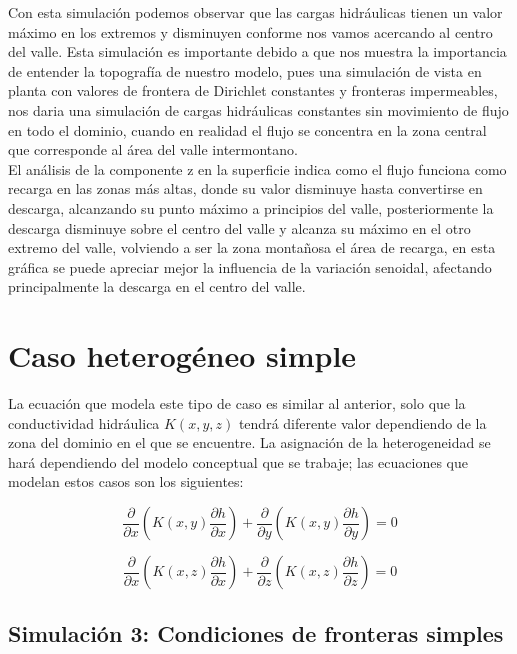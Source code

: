 Con esta simulación podemos observar que las cargas hidráulicas tienen un valor máximo en los extremos y disminuyen conforme nos vamos acercando al centro del valle. Esta simulación es importante debido a que nos muestra la importancia de entender la topografía de nuestro modelo, pues una simulación de vista en planta con valores de frontera de Dirichlet constantes y fronteras impermeables, nos daria una simulación de cargas hidráulicas constantes sin movimiento de flujo en todo el dominio, cuando en realidad el flujo se concentra en la zona central que corresponde al área del valle intermontano.
\\

El análisis de la componente z en la superficie indica como el flujo funciona como recarga en las zonas más altas, donde su valor disminuye hasta convertirse en descarga, alcanzando su punto máximo a principios del valle, posteriormente la descarga disminuye sobre el centro del valle y alcanza su máximo en el otro extremo del valle, volviendo a ser la zona montañosa el área de recarga, en esta gráfica se puede apreciar mejor la influencia de la variación senoidal, afectando principalmente la descarga en el centro del valle.

\section{Caso heterogéneo simple}

La ecuación que modela este tipo de caso es similar al anterior, solo que la conductividad hidráulica $K(x,y,z)$ tendrá diferente valor dependiendo de la zona del dominio en el que se encuentre. La asignación de la heterogeneidad se hará dependiendo del modelo conceptual que se trabaje; las ecuaciones que modelan estos casos son los siguientes:

\begin{equation}
\label{eqn:phi14}                         
\dfrac{\partial}{\partial{x}}(K(x,y)\dfrac{\partial{h}}{\partial{x}})+\dfrac{\partial}{\partial{y}}(K(x,y)\dfrac{\partial{h}}{\partial{y}})=0
\end{equation}

\begin{equation}
\label{eqn:phi15}                         
\dfrac{\partial}{\partial{x}}(K(x,z)\dfrac{\partial{h}}{\partial{x}})+\dfrac{\partial}{\partial{z}}(K(x,z)\dfrac{\partial{h}}{\partial{z}})=0
\end{equation}

\subsection{Simulación 3: Condiciones de fronteras simples}

